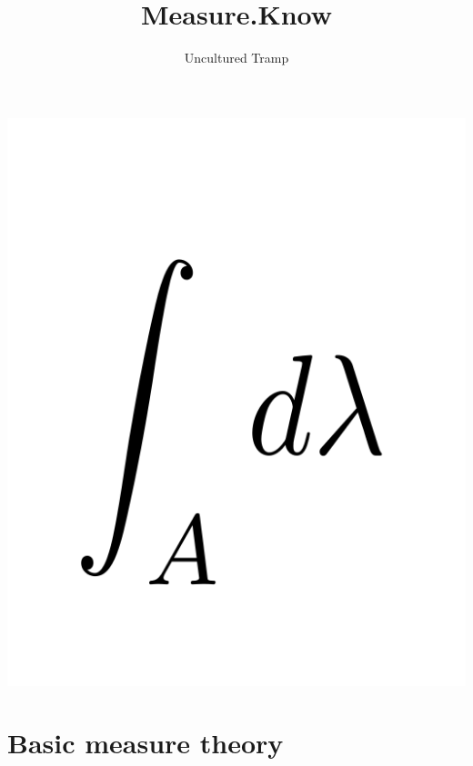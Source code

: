 \documentclass[12pt]{scrartcl}
\author{Uncultured Tramp}
\title{Measure.Know}
\renewcommand{\.}{\; . \;}
\begin{document}
\maketitle
\begin{center}
\includegraphics[scale=0.7]{MeasureCover.png}
\end{center}
\newpage
\tableofcontents
\newpage
\section{Basic measure theory}
\end{document}
